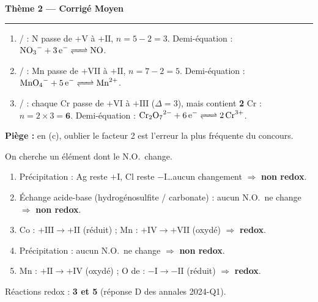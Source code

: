\documentclass[11pt,a4paper]{article}
\newcommand{\NO}{\ensuremath{\mathrm{N.O.}}}
\begin{document}
\begin{center}
{\LARGE\bfseries\color{primarydark}Thème 2 — Corrigé Moyen}\\[-2pt]
{\color{corrcol}\rule{\textwidth}{1pt}}
\end{center}

\begin{corr}
\begin{enumerate}[label=(\alph*),leftmargin=2em,topsep=1pt,itemsep=1.5pt]
  \item {}/ : N passe de $+\mathrm{V}$ à $+\mathrm{II}$, $n=5-2=3$.
        Demi-équation : $\ce{NO3^- + 3 e^- <=> NO}$.
  \item {}/ : Mn passe de $+\mathrm{VII}$ à $+\mathrm{II}$, $n=7-2=5$.
        Demi-équation : $\ce{MnO4^- + 5 e^- <=> Mn^{2+}}$.
  \item {}/ : chaque Cr passe de $+\mathrm{VI}$ à $+\mathrm{III}$ ($\Delta=3$),
        mais  contient \textbf{2} Cr : $n=2\times3=\mathbf{6}$.
        Demi-équation : $\ce{Cr2O7^{2-} + 6 e^- <=> 2 Cr^{3+}}$.
\end{enumerate}
\textbf{Piège :} en (c), oublier le facteur 2 est l'erreur la plus fréquente du concours.
\end{corr}

\begin{corr}
On cherche un élément dont le \NO\ change.
\begin{enumerate}[label=\arabic*),leftmargin=2.2em,topsep=1pt,itemsep=1.5pt]
  \item Précipitation  : Ag reste $+\mathrm{I}$, Cl reste $-\mathrm{I}$\ldots aucun changement $\Rightarrow$ \textbf{non redox}.
  \item Échange acide-base (hydrogénosulfite / carbonate) : aucun \NO\ ne change $\Rightarrow$ \textbf{non redox}.
  \item Co : $+\mathrm{III}\to+\mathrm{II}$ (réduit) ; Mn : $+\mathrm{IV}\to+\mathrm{VII}$ (oxydé) $\Rightarrow$ \textbf{redox}. \checkmark
  \item Précipitation  : aucun \NO\ ne change $\Rightarrow$ \textbf{non redox}.
  \item Mn : $+\mathrm{II}\to+\mathrm{IV}$ (oxydé) ; O de  : $-\mathrm{I}\to-\mathrm{II}$ (réduit) $\Rightarrow$ \textbf{redox}. \checkmark
\end{enumerate}
Réactions redox : \textbf{3 et 5} (réponse D des annales 2024-Q1).
\end{corr}
\end{document}
